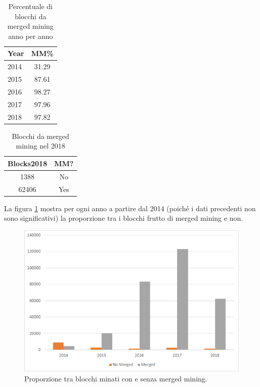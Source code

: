 \begin{table}
\begin{tabular}{|l|c|}
	\hline 
	\textbf{Year} & \textbf{MM\%} \\ 
	\hline 
	2014 & 31.29 \\ 
	\hline 
	2015 & 87.61 \\ 
	\hline 
	2016 & 98.27 \\ 
	\hline 
	2017 & 97.96 \\ 
	\hline 
	2018 & 97.82 \\ 
	\hline 
\end{tabular}
\caption{Percentuale di blocchi da merged mining anno per anno}
\end{table}
 
\begin{table}
\begin{tabular}{|c|c|}
	\hline 
	\textbf{Blocks2018} & \textbf{MM?} \\ 
	\hline 
	1388 & No \\ 
	\hline
	62406 & Yes \\
	\hline
\end{tabular}
\caption{Blocchi da merged mining nel 2018}
\end{table}


La figura \ref{fig:nomerged-vs-merged} mostra per ogni anno a partire dal 2014 (poiché i dati precedenti non sono significativi) la proporzione tra i blocchi frutto di merged mining e non.

\begin{figure}[h!]
	\centering
	\includegraphics[width=1.0\linewidth]{images/nomerged-vs-merged}
	\caption{Proporzione tra blocchi minati con e senza merged mining.}
	\label{fig:nomerged-vs-merged}
\end{figure}


